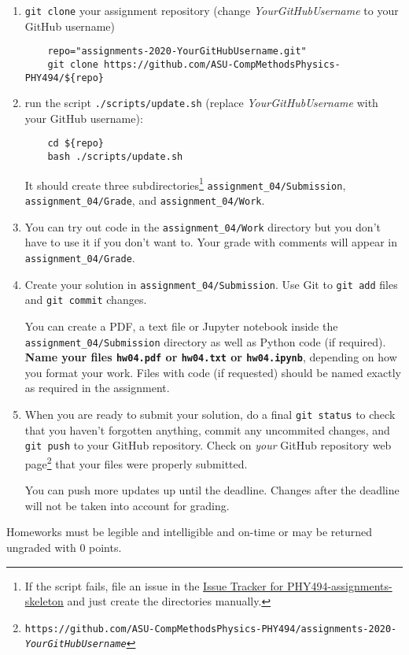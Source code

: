 \documentclass[letterpaper]{scrartcl}
\newcommand{\anumber}{4}
\newcommand{\anum}{0\anumber}
\begin{document}
\begin{enumerate}
\item \texttt{git clone} your assignment repository (change
  \emph{YourGitHubUsername} to your GitHub username)
  \begin{verbatim}
    repo="assignments-2020-YourGitHubUsername.git" 
    git clone https://github.com/ASU-CompMethodsPhysics-PHY494/${repo}
  \end{verbatim}
\item run the script
  \texttt{./scripts/update.sh} (replace \emph{YourGitHubUsername} with
  your GitHub username):
  \begin{verbatim}
    cd ${repo} 
    bash ./scripts/update.sh
  \end{verbatim}
  It should create three subdirectories\footnote{If the script fails,
    file an issue in the
    \href{https://github.com/ASU-CompMethodsPhysics-PHY494/PHY494-assignments-skeleton/issues}{Issue
      Tracker for PHY494-assignments-skeleton} and just create the
    directories manually.} \texttt{assignment\_\anum/Submission},
  \texttt{assignment\_\anum/Grade}, and
  \texttt{assignment\_\anum/Work}.
\item You can try out code in the \texttt{assignment\_\anum/Work}
  directory but you don't have to use it if you don't want to. Your
  grade with comments will appear in
  \texttt{assignment\_\anum/Grade}.
\item Create your solution in
  \texttt{assignment\_\anum/Submission}. Use Git to \texttt{git
    add} files and \texttt{git commit} changes.

  You can create a PDF, a text file or Jupyter notebook inside the
  \texttt{assignment\_\anum/Submission} directory as well as Python
  code (if required). \textbf{Name your files \texttt{hw\anum.pdf} or
    \texttt{hw\anum.txt} or \texttt{hw\anum.ipynb}}, depending on how
  you format your work. Files with code (if requested) should be named
  exactly as required in the assignment.
\item When you are ready to submit your solution, do a final
  \texttt{git status} to check that you haven't forgotten anything,
  commit any uncommited changes, and \texttt{git push} to your GitHub
  repository. Check on \emph{your} GitHub repository web
  page\footnote{\texttt{https://github.com/ASU-CompMethodsPhysics-PHY494/assignments-2020-\emph{YourGitHubUsername}}}
  that your files were properly submitted.

  You can push more updates up until the deadline. Changes after the
  deadline will not be taken into account for grading.
\end{enumerate}
Homeworks must be legible and intelligible and on-time or may  be
returned ungraded with 0 points.
\end{document}
